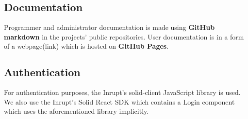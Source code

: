 \subsection*{Documentation}
Programmer and administrator documentation is made using \textbf{GitHub markdown} in the projects' public repositories.
User documentation is in a form of a webpage(link) which is hosted on \textbf{GitHub Pages}.

\subsection*{Authentication}
For authentication purposes, the Inrupt's solid-client JavaScript library is used.
We also use the Inrupt's Solid React SDK which contains a Login component which uses the aforementioned library implicitly.
